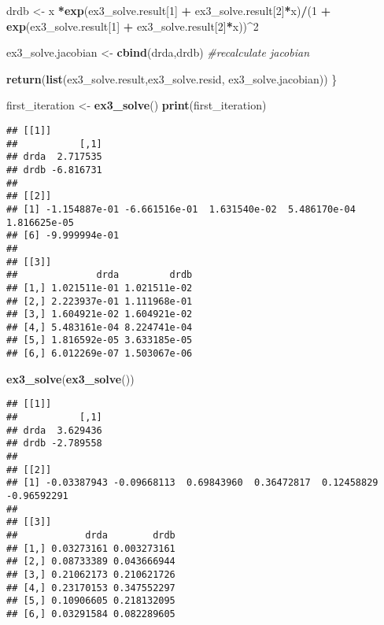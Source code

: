 \documentclass[
]{article}
\newenvironment{Shaded}{\begin{snugshade}}{\end{snugshade}}
\newcommand{\CommentTok}[1]{\textcolor[rgb]{0.56,0.35,0.01}{\textit{#1}}}
\newcommand{\DecValTok}[1]{\textcolor[rgb]{0.00,0.00,0.81}{#1}}
\newcommand{\KeywordTok}[1]{\textcolor[rgb]{0.13,0.29,0.53}{\textbf{#1}}}
\newcommand{\NormalTok}[1]{#1}
\newcommand{\OperatorTok}[1]{\textcolor[rgb]{0.81,0.36,0.00}{\textbf{#1}}}
\newcommand{\StringTok}[1]{\textcolor[rgb]{0.31,0.60,0.02}{#1}}
\begin{document}
\begin{Shaded}
\begin{Highlighting}[]
\NormalTok{  drdb \textless{}{-}}\StringTok{ }\NormalTok{x }\OperatorTok{*}\KeywordTok{exp}\NormalTok{(ex3\_solve.result[}\DecValTok{1}\NormalTok{] }\OperatorTok{+}\StringTok{ }\NormalTok{ex3\_solve.result[}\DecValTok{2}\NormalTok{]}\OperatorTok{*}\NormalTok{x)}\OperatorTok{/}\NormalTok{(}\DecValTok{1} \OperatorTok{+}\StringTok{ }\KeywordTok{exp}\NormalTok{(ex3\_solve.result[}\DecValTok{1}\NormalTok{] }\OperatorTok{+}\StringTok{ }\NormalTok{ex3\_solve.result[}\DecValTok{2}\NormalTok{]}\OperatorTok{*}\NormalTok{x))}\OperatorTok{\^{}}\DecValTok{2}

\NormalTok{  ex3\_solve.jacobian \textless{}{-}}\StringTok{ }\KeywordTok{cbind}\NormalTok{(drda,drdb) }\CommentTok{\#recalculate jacobian}

    \KeywordTok{return}\NormalTok{(}\KeywordTok{list}\NormalTok{(ex3\_solve.result,ex3\_solve.resid, ex3\_solve.jacobian))}
\NormalTok{  \}}

\NormalTok{first\_iteration \textless{}{-}}\StringTok{ }\KeywordTok{ex3\_solve}\NormalTok{()}
\KeywordTok{print}\NormalTok{(first\_iteration)}
\end{Highlighting}
\end{Shaded}

\begin{verbatim}
## [[1]]
##           [,1]
## drda  2.717535
## drdb -6.816731
## 
## [[2]]
## [1] -1.154887e-01 -6.661516e-01  1.631540e-02  5.486170e-04  1.816625e-05
## [6] -9.999994e-01
## 
## [[3]]
##              drda         drdb
## [1,] 1.021511e-01 1.021511e-02
## [2,] 2.223937e-01 1.111968e-01
## [3,] 1.604921e-02 1.604921e-02
## [4,] 5.483161e-04 8.224741e-04
## [5,] 1.816592e-05 3.633185e-05
## [6,] 6.012269e-07 1.503067e-06
\end{verbatim}

\begin{Shaded}
\begin{Highlighting}[]
\KeywordTok{ex3\_solve}\NormalTok{(}\KeywordTok{ex3\_solve}\NormalTok{())}
\end{Highlighting}
\end{Shaded}

\begin{verbatim}
## [[1]]
##           [,1]
## drda  3.629436
## drdb -2.789558
## 
## [[2]]
## [1] -0.03387943 -0.09668113  0.69843960  0.36472817  0.12458829 -0.96592291
## 
## [[3]]
##            drda        drdb
## [1,] 0.03273161 0.003273161
## [2,] 0.08733389 0.043666944
## [3,] 0.21062173 0.210621726
## [4,] 0.23170153 0.347552297
## [5,] 0.10906605 0.218132095
## [6,] 0.03291584 0.082289605
\end{verbatim}
\end{document}
